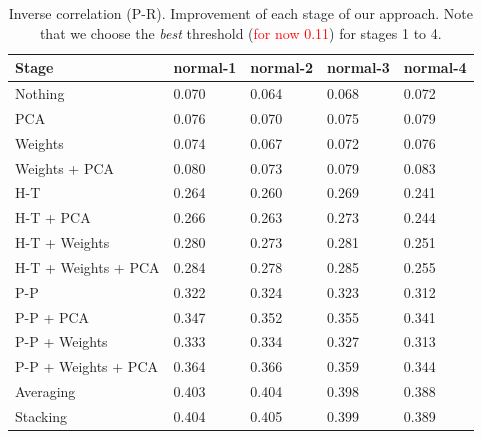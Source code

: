 \documentclass[wcp]{jmlr}
\begin{document}
\begin{table}[htb]
\centering
\caption{Inverse correlation (P-R). Improvement of each stage of our approach. Note that we choose the
         \textit{best} threshold (\textcolor{red}{for now 0.11}) for stages 1 to 4.}
\begin{tabular}{*{5}{l}}
\toprule
Stage               & normal-1 & normal-2 & normal-3 & normal-4 \\
\midrule
Nothing             & 0.070 & 0.064 & 0.068 & 0.072\\
PCA                 & 0.076 & 0.070 & 0.075 & 0.079\\
Weights             & 0.074 & 0.067 & 0.072 & 0.076\\
Weights + PCA       & 0.080 & 0.073 & 0.079 & 0.083\\
H-T                 & 0.264 & 0.260 & 0.269 & 0.241\\
H-T + PCA           & 0.266 & 0.263 & 0.273 & 0.244\\
H-T + Weights       & 0.280 & 0.273 & 0.281 & 0.251\\
H-T + Weights + PCA & 0.284 & 0.278 & 0.285 & 0.255\\
P-P                 & 0.322 & 0.324 & 0.323 & 0.312\\
P-P + PCA           & 0.347 & 0.352 & 0.355 & 0.341\\
P-P + Weights       & 0.333 & 0.334 & 0.327 & 0.313\\
P-P + Weights + PCA & 0.364 & 0.366 & 0.359 & 0.344\\
Averaging           & 0.403 & 0.404 & 0.398 & 0.388\\
Stacking            & 0.404 & 0.405 & 0.399 & 0.389\\
\bottomrule
\end{tabular}
\end{table}
\end{document}
